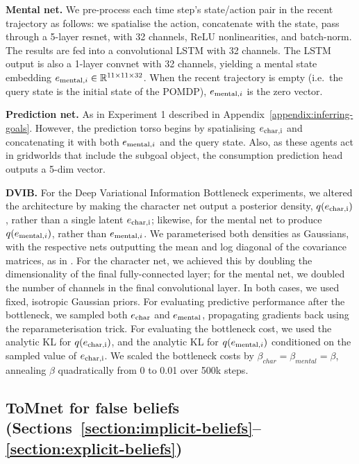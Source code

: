 \documentclass{article}
\begin{document}
{\bf Mental net.} We pre-process each time step's state/action pair in the recent trajectory as follows: we spatialise the action, concatenate with the state, pass through a 5-layer resnet, with 32 channels, ReLU nonlinearities, and batch-norm. The results are fed into a convolutional LSTM with 32 channels. The LSTM output is also a 1-layer convnet with 32 channels, yielding a mental state embedding $e_{\mathrm{mental},i} \in \mathbb{R}^{11 \times 11 \times 32}$. When the recent trajectory is empty (i.e.\ the query state is the initial state of the POMDP), $e_{\mathrm{mental},i}$ is the zero vector.

{\bf Prediction net.} As in Experiment 1 described in Appendix~\ref{appendix:inferring-goals}. However, the prediction torso begins by spatialising $e_{\mathrm{char,i}}$ and concatenating it with both $e_{\mathrm{mental},i}$ and the query state. Also, as these agents act in gridworlds that include the subgoal object, the consumption prediction head outputs a 5-dim vector.

{\bf DVIB.} For the Deep Variational Information Bottleneck experiments, we altered the architecture by making the character net output a posterior density, $q(e_{\mathrm{char,i}})$, rather than a single latent $e_{\mathrm{char,i}}$; likewise, for the mental net to produce $q(e_{\mathrm{mental},i})$, rather than $e_{\mathrm{mental},i}$. We parameterised both densities as Gaussians, with the respective nets outputting the mean and log diagonal of the covariance matrices, as in \citet{kingma2013auto}. For the character net, we achieved this by doubling the dimensionality of the final fully-connected layer; for the mental net, we doubled the number of channels in the final convolutional layer. In both cases, we used fixed, isotropic Gaussian priors. For evaluating predictive performance after the bottleneck, we sampled both $e_{\mathrm{char}}$ and $e_{\mathrm{mental}}$, propagating gradients back using the reparameterisation trick. For evaluating the bottleneck cost, we used the analytic KL for $q(e_{\mathrm{char,i}})$, and the analytic KL for $q(e_{\mathrm{mental},i})$ conditioned on the sampled value of $e_{\mathrm{char,i}}$. We scaled the bottleneck costs by $\beta_{char} = \beta_{mental} = \beta$, annealing $\beta$ quadratically from 0 to 0.01 over 500k steps. 


\subsection{ToMnet for false beliefs (Sections~\ref{section:implicit-beliefs}--\ref{section:explicit-beliefs})}
\end{document}
